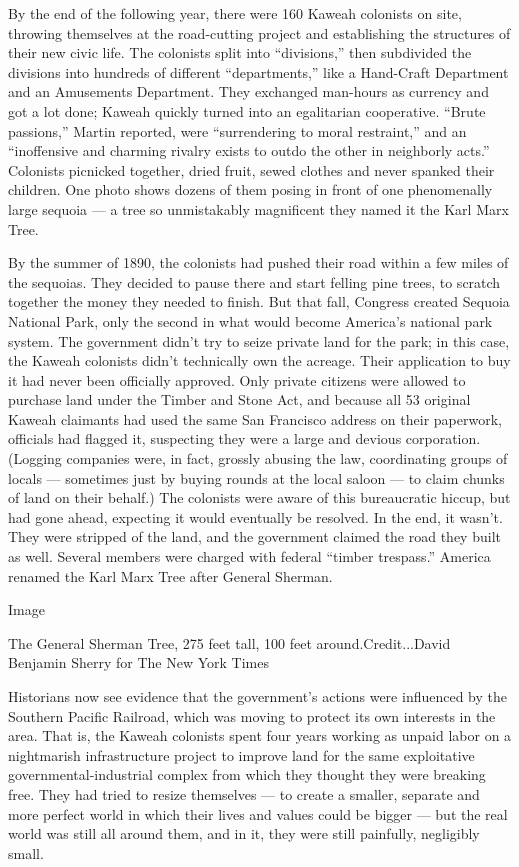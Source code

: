 By the end of the following year, there were 160 Kaweah colonists on
site, throwing themselves at the road-cutting project and establishing
the structures of their new civic life. The colonists split into
``divisions,'' then subdivided the divisions into hundreds of different
``departments,'' like a Hand-Craft Department and an Amusements
Department. They exchanged man-hours as currency and got a lot done;
Kaweah quickly turned into an egalitarian cooperative. ``Brute
passions,'' Martin reported, were ``surrendering to moral restraint,''
and an ``inoffensive and charming rivalry exists to outdo the other in
neighborly acts.'' Colonists picnicked together, dried fruit, sewed
clothes and never spanked their children. One photo shows dozens of them
posing in front of one phenomenally large sequoia --- a tree so
unmistakably magnificent they named it the Karl Marx Tree.

By the summer of 1890, the colonists had pushed their road within a few
miles of the sequoias. They decided to pause there and start felling
pine trees, to scratch together the money they needed to finish. But
that fall, Congress created Sequoia National Park, only the second in
what would become America's national park system. The government didn't
try to seize private land for the park; in this case, the Kaweah
colonists didn't technically own the acreage. Their application to buy
it had never been officially approved. Only private citizens were
allowed to purchase land under the Timber and Stone Act, and because all
53 original Kaweah claimants had used the same San Francisco address on
their paperwork, officials had flagged it, suspecting they were a large
and devious corporation. (Logging companies were, in fact, grossly
abusing the law, coordinating groups of locals --- sometimes just by
buying rounds at the local saloon --- to claim chunks of land on their
behalf.) The colonists were aware of this bureaucratic hiccup, but had
gone ahead, expecting it would eventually be resolved. In the end, it
wasn't. They were stripped of the land, and the government claimed the
road they built as well. Several members were charged with federal
``timber trespass.'' America renamed the Karl Marx Tree after General
Sherman.

Image

The General Sherman Tree, 275 feet tall, 100 feet around.Credit...David
Benjamin Sherry for The New York Times

Historians now see evidence that the government's actions were
influenced by the Southern Pacific Railroad, which was moving to protect
its own interests in the area. That is, the Kaweah colonists spent four
years working as unpaid labor on a nightmarish infrastructure project to
improve land for the same exploitative governmental-industrial complex
from which they thought they were breaking free. They had tried to
resize themselves --- to create a smaller, separate and more perfect
world in which their lives and values could be bigger --- but the real
world was still all around them, and in it, they were still painfully,
negligibly small.

